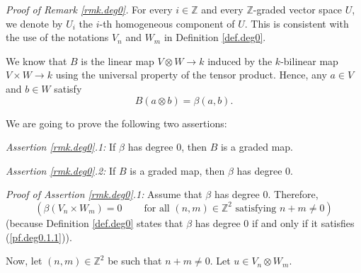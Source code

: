 \documentclass[etingof-lie.tex]{subfiles}
\begin{document}
\begin{verlong}
\textit{Proof of Remark \ref{rmk.deg0}.} For every $i\in\mathbb{Z}$ and every
$\mathbb{Z}$-graded vector space $U$, we denote by $U_{i}$ the $i$-th
homogeneous component of $U$. This is consistent with the use of the notations
$V_{n}$ and $W_{m}$ in Definition \ref{def.deg0}.

We know that $B$ is the linear map $V\otimes W\rightarrow k$ induced by the
$k$-bilinear map $V\times W\rightarrow k$ using the universal property of the
tensor product. Hence, any $a\in V$ and $b\in W$ satisfy%
\begin{equation}
B\left(  a\otimes b\right)  =\beta\left(  a,b\right)  . \label{pf.deg0.Bb}%
\end{equation}


We are going to prove the following two assertions:

\textit{Assertion \ref{rmk.deg0}.1:} If $\beta$ has degree $0$, then $B$ is a
graded map.

\textit{Assertion \ref{rmk.deg0}.2:} If $B$ is a graded map, then $\beta$ has
degree $0$.

\textit{Proof of Assertion \ref{rmk.deg0}.1:} Assume that $\beta$ has degree
$0$. Therefore,%
\begin{equation}
\left(  \beta\left(  V_{n}\times W_{m}\right)  =0\ \ \ \ \ \ \ \ \ \ \text{for
all }\left(  n,m\right)  \in\mathbb{Z}^{2}\text{ satisfying }n+m\neq0\right)
\label{pf.deg0.1.1}%
\end{equation}
(because Definition \ref{def.deg0} states that $\beta$ has degree $0$ if and
only if it satisfies (\ref{pf.deg0.1.1})).

Now, let $\left(  n,m\right)  \in\mathbb{Z}^{2}$ be such that $n+m\neq0$. Let
$u\in V_{n}\otimes W_{m}$.


\end{verlong}
\end{document}
